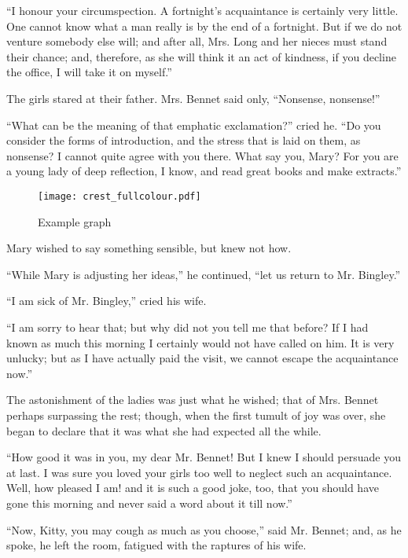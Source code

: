       “I honour your circumspection. A fortnight’s acquaintance is
      certainly very little. One cannot know what a man really is by
      the end of a fortnight. But if we do not venture somebody else
      will; and after all, Mrs. Long and her nieces must stand their
      chance; and, therefore, as she will think it an act of kindness,
      if you decline the office, I will take it on myself.”

      The girls stared at their father. Mrs. Bennet said only,
      “Nonsense, nonsense!”

      “What can be the meaning of that emphatic exclamation?” cried he.
      “Do you consider the forms of introduction, and the stress that
      is laid on them, as nonsense? I cannot quite agree with you
      there. What say you, Mary? For you are a young lady of deep
      reflection, I know, and read great books and make extracts.”

\begin{figure}[h]
	\centering
	\texttt{[image: crest\_fullcolour.pdf]}
	\caption{Example graph}
	\label{plot_example_graph}
\end{figure}
      Mary wished to say something sensible, but knew not how.

      “While Mary is adjusting her ideas,” he continued, “let us return
      to Mr. Bingley.”

      “I am sick of Mr. Bingley,” cried his wife.

      “I am sorry to hear that; but why did not you tell me that
      before? If I had known as much this morning I certainly would not
      have called on him. It is very unlucky; but as I have actually
      paid the visit, we cannot escape the acquaintance now.”

      The astonishment of the ladies was just what he wished; that of
      Mrs. Bennet perhaps surpassing the rest; though, when the first
      tumult of joy was over, she began to declare that it was what she
      had expected all the while.

      “How good it was in you, my dear Mr. Bennet! But I knew I should
      persuade you at last. I was sure you loved your girls too well to
      neglect such an acquaintance. Well, how pleased I am! and it is
      such a good joke, too, that you should have gone this morning and
      never said a word about it till now.”

      “Now, Kitty, you may cough as much as you choose,” said Mr.
      Bennet; and, as he spoke, he left the room, fatigued with the
      raptures of his wife.

